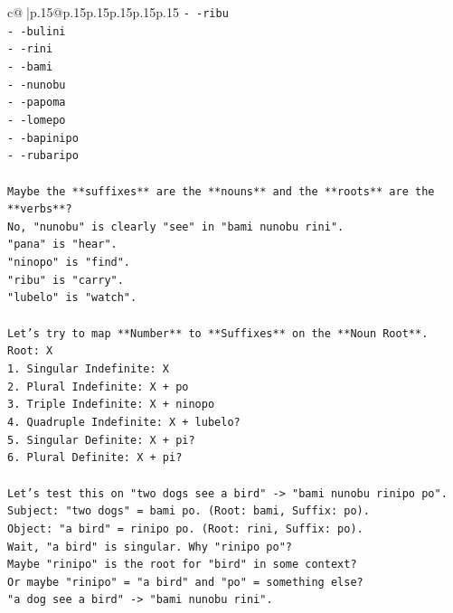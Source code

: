 \documentclass{article}
\begin{document}
{\begin{supertabular}{c@{$\;$}|p{.15\linewidth}@{}p{.15\linewidth}p{.15\linewidth}p{.15\linewidth}p{.15\linewidth}p{.15\linewidth}}
{{{\texttt{{-} {-}ribu} \\
\texttt{{-} {-}bulini} \\
\texttt{{-} {-}rini} \\
\texttt{{-} {-}bami} \\
\texttt{{-} {-}nunobu} \\
\texttt{{-} {-}papoma} \\
\texttt{{-} {-}lomepo} \\
\texttt{{-} {-}bapinipo} \\
\texttt{{-} {-}rubaripo} \\
\\ 
\texttt{Maybe the **suffixes** are the **nouns** and the **roots** are the **verbs**?} \\
\texttt{No, "nunobu" is clearly "see" in "bami nunobu rini".} \\
\texttt{"pana" is "hear".} \\
\texttt{"ninopo" is "find".} \\
\texttt{"ribu" is "carry".} \\
\texttt{"lubelo" is "watch".} \\
\\ 
\texttt{Let's try to map **Number** to **Suffixes** on the **Noun Root**.} \\
\texttt{Root: X} \\
\texttt{1. Singular Indefinite: X} \\
\texttt{2. Plural Indefinite: X + po} \\
\texttt{3. Triple Indefinite: X + ninopo} \\
\texttt{4. Quadruple Indefinite: X + lubelo?} \\
\texttt{5. Singular Definite: X + pi?} \\
\texttt{6. Plural Definite: X + pi?} \\
\\ 
\texttt{Let's test this on "two dogs see a bird" {-}> "bami nunobu rinipo po".} \\
\texttt{Subject: "two dogs" = bami po. (Root: bami, Suffix: po).} \\
\texttt{Object: "a bird" = rinipo po. (Root: rini, Suffix: po).} \\
\texttt{Wait, "a bird" is singular. Why "rinipo po"?} \\
\texttt{Maybe "rinipo" is the root for "bird" in some context?} \\
\texttt{Or maybe "rinipo" = "a bird" and "po" = something else?} \\
\texttt{"a dog see a bird" {-}> "bami nunobu rini".} \\
}}}
\end{supertabular}}
\end{document}
